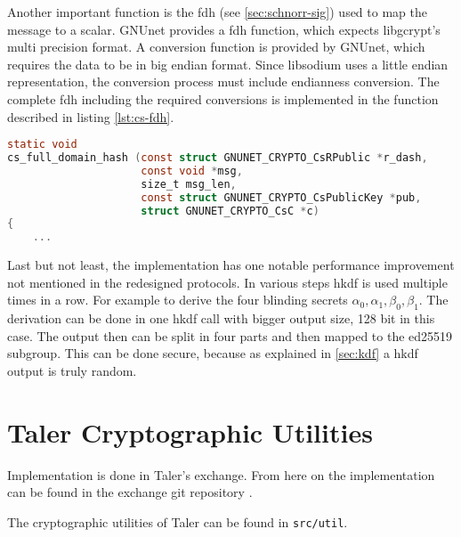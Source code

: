 Another important function is the \gls{fdh} (see \ref{sec:schnorr-sig}) used to map the message to a scalar.
GNUnet provides a \gls{fdh} function, which expects libgcrypt's multi precision format.
A conversion function is provided by GNUnet, which requires the data to be in big endian format.
Since libsodium uses a little endian representation, the conversion process must include endianness conversion.
The complete \gls{fdh} including the required conversions is implemented in the function described in listing \ref{lst:cs-fdh}.
\begin{lstlisting}[style=bfh-c, language=C, caption={Function cs\_full\_domain\_hash - Crypto API}, label={lst:cs-fdh}]
static void
cs_full_domain_hash (const struct GNUNET_CRYPTO_CsRPublic *r_dash,
                     const void *msg,
                     size_t msg_len,
                     const struct GNUNET_CRYPTO_CsPublicKey *pub,
                     struct GNUNET_CRYPTO_CsC *c)
{
    ...
\end{lstlisting}

Last but not least, the implementation has one notable performance improvement not mentioned in the redesigned protocols.
In various steps \gls{hkdf} is used multiple times in a row.
For example to derive the four blinding secrets $\alpha_0, \alpha_1, \beta_0, \beta_1$.
The derivation can be done in one \gls{hkdf} call with bigger output size, 128 bit in this case.
The output then can be split in four parts and then mapped to the ed25519 subgroup.
This can be done secure, because as explained in \autoref{sec:kdf} a \gls{hkdf} output is truly random.


\section{Taler Cryptographic Utilities}
\begin{bfhNoteBox}
    Implementation is done in Taler's exchange.
    From here on the implementation can be found in the exchange git repository \cite{taler-git:exchange}.
\end{bfhNoteBox}
The cryptographic utilities of Taler can be found in \texttt{src/util}.


